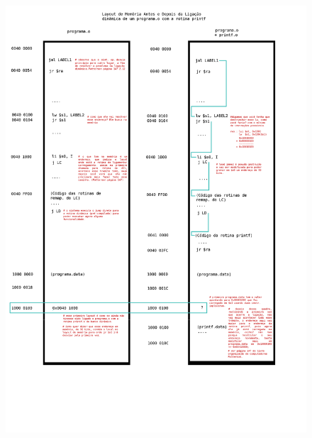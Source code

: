 \documentclass{article}
\begin{document}
  \pagebreak
  \begin{figure}
    \centering
    \includegraphics{dll-so.png}
  \end{figure}
\end{document}
